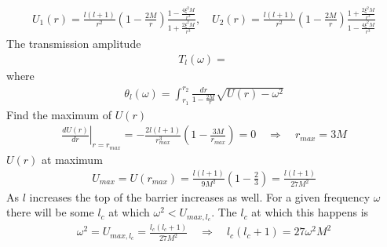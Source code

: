 \documentclass[12pt]{article}
\begin{document}
\begin{gather}
U_{1}(r)
=
\frac{l (l + 1)}{r^{2}}
(1 - \frac{2 M}{r})
\frac{1 - \frac{4 \xi^{2} M}{r^{3}}}{1 + \frac{2 \xi^{2} M}{r^{3}}}
,
\quad
U_{2}(r)
=
\frac{l (l + 1)}{r^{2}}
(1 - \frac{2 M}{r})
\frac{1 + \frac{2 \xi^{2} M}{r^{3}}}{1 - \frac{4 \xi^{2} M}{r^{3}}}
\end{gather}
The transmission amplitude
\begin{gather}
T_{l}(\omega)
=
\frac{}{}
\end{gather}
where
\begin{gather}
\theta_{l}(\omega)
=
\int_{r_{1}}^{r_{2}}
\frac{dr}{1 - \frac{2 M}{r}}
\sqrt{U(r) - \omega^{2}}
\end{gather}
Find the maximum of $U(r)$
\begin{gather}
\left.
\frac{dU(r)}{dr} 
\right|_{r = r_{max}}
=
-
\frac{2 l (l + 1)}{r_{max}^{3}}
(1 - \frac{3 M}{r_{max}})
=0
\quad
\Rightarrow
\quad
r_{max}
=
3 M
\end{gather}
$U(r)$ at maximum
\begin{gather}
U_{max} = U(r_{max})
=
\frac{l (l + 1)}{9 M^{2}}
(1- \frac{2}{3})
=
\frac{l (l + 1)}{27 M^{2}}
\end{gather}
As $l$ increases the top of the barrier increases as well. For a given frequency $\omega$ there will be some $l_{c}$ at which $\omega^{2} < U_{max,l_{c}}$. The $l_{c}$ at which this happens is
\begin{gather}
\omega^{2} = U_{max,l_{c}}
=
\frac{l_{c} (l_{c} + 1)}{27 M^{2}}
\quad
\Rightarrow
\quad
l_{c} (l_{c} + 1)
=
27 \omega^{2} M^{2}
\label{lcdef}
\end{gather}
\end{document}
